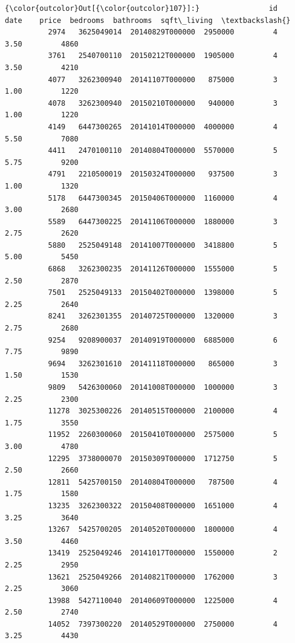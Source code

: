 \documentclass[11pt]{article}
\begin{document}
\begin{Verbatim}[commandchars=\\\{\}]
{\color{outcolor}Out[{\color{outcolor}107}]:}                id             date    price  bedrooms  bathrooms  sqft\_living  \textbackslash{}
          2974   3625049014  20140829T000000  2950000         4       3.50         4860   
          3761   2540700110  20150212T000000  1905000         4       3.50         4210   
          4077   3262300940  20141107T000000   875000         3       1.00         1220   
          4078   3262300940  20150210T000000   940000         3       1.00         1220   
          4149   6447300265  20141014T000000  4000000         4       5.50         7080   
          4411   2470100110  20140804T000000  5570000         5       5.75         9200   
          4791   2210500019  20150324T000000   937500         3       1.00         1320   
          5178   6447300345  20150406T000000  1160000         4       3.00         2680   
          5589   6447300225  20141106T000000  1880000         3       2.75         2620   
          5880   2525049148  20141007T000000  3418800         5       5.00         5450   
          6868   3262300235  20141126T000000  1555000         5       2.50         2870   
          7501   2525049133  20150402T000000  1398000         5       2.25         2640   
          8241   3262301355  20140725T000000  1320000         3       2.75         2680   
          9254   9208900037  20140919T000000  6885000         6       7.75         9890   
          9694   3262301610  20141118T000000   865000         3       1.50         1530   
          9809   5426300060  20141008T000000  1000000         3       2.25         2300   
          11278  3025300226  20140515T000000  2100000         4       1.75         3550   
          11952  2260300060  20150410T000000  2575000         5       3.00         4780   
          12295  3738000070  20150309T000000  1712750         5       2.50         2660   
          12811  5425700150  20140804T000000   787500         4       1.75         1580   
          13235  3262300322  20150408T000000  1651000         4       3.25         3640   
          13267  5425700205  20140520T000000  1800000         4       3.50         4460   
          13419  2525049246  20141017T000000  1550000         2       2.25         2950   
          13621  2525049266  20140821T000000  1762000         3       2.25         3060   
          13988  5427110040  20140609T000000  1225000         4       2.50         2740   
          14052  7397300220  20140529T000000  2750000         4       3.25         4430   

\end{Verbatim}
\end{document}
